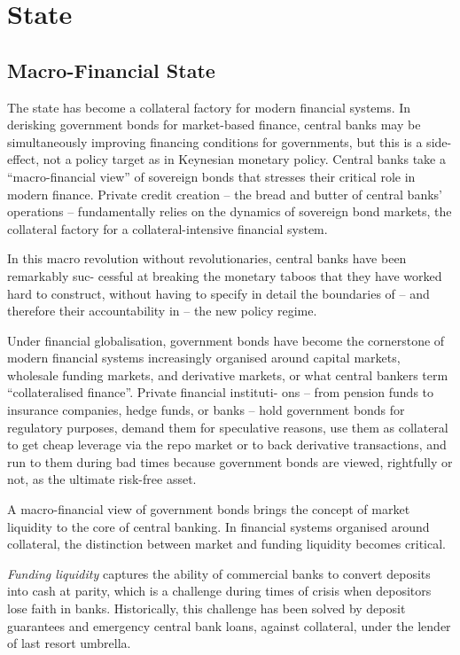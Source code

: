 \documentclass[
]{book}
\begin{document}
\hypertarget{state}{%
\chapter{State}\label{state}}

\hypertarget{macro-financial-state}{%
\section{Macro-Financial State}\label{macro-financial-state}}

The state has become a collateral factory for modern financial
systems.
In derisking government bonds for market-based finance, central banks may be
simultaneously improving financing conditions for governments, but this is a side-effect, not
a policy target as in Keynesian monetary policy.
Central banks take a ``macro-financial view'' of sovereign bonds that stresses their critical
role in modern finance.
Private credit creation
-- the bread and butter of central banks' operations -- fundamentally relies on the dynamics
of sovereign bond markets, the collateral factory for a collateral-intensive financial system.

In this macro revolution without revolutionaries, central banks have been remarkably suc-
cessful at breaking the monetary taboos that they have worked hard to construct, without
having to specify in detail the boundaries of -- and therefore their accountability in --
the new policy regime.

Under financial globalisation,
government bonds have become the cornerstone of modern financial systems
increasingly organised around capital markets, wholesale funding markets,
and derivative markets, or what central bankers term ``collateralised finance''.
Private financial instituti-
ons -- from pension funds to insurance companies, hedge funds, or banks -- hold government
bonds for regulatory purposes, demand them for speculative reasons, use them as collateral
to get cheap leverage via the repo market or to back derivative transactions, and run to them
during bad times because government bonds are viewed, rightfully or not, as the ultimate
risk-free asset.

A macro-financial view of government bonds brings the concept of market liquidity to the
core of central banking. In financial systems organised around collateral,
the distinction between market and funding liquidity becomes critical.

\emph{Funding liquidity} captures the ability of commercial banks to convert deposits into cash
at parity, which is a challenge during times of crisis when depositors lose faith in banks.
Historically, this challenge has been solved by deposit guarantees and emergency central bank
loans, against collateral, under the lender of last resort umbrella.
\end{document}
